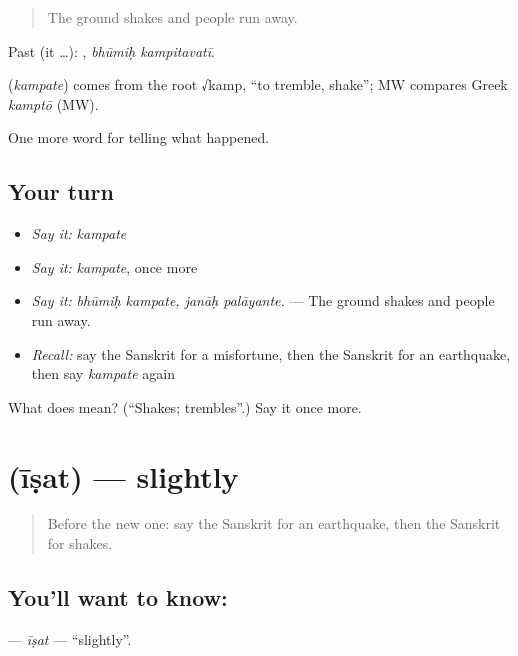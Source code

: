 \begin{quote}
The ground shakes and people run away.
\end{quote}

Past (it …):  , \emph{bhūmiḥ kampitavatī}.

\begin{cousinweb}
\textbf{} (\emph{kampate}) comes from the root √kamp, \textquotedblleft{}to tremble, shake\textquotedblright{}; MW compares Greek \emph{kamptō} (MW).
\end{cousinweb}

\begin{grammarlens}[title={What you've built}]
One more word for telling what happened.
\end{grammarlens}

\subsection*{Your turn}
\begin{itemize}
\raggedright
  \item \emph{Say it:} \emph{kampate}
  \item \emph{Say it:} \emph{kampate}, once more
  \item \emph{Say it:} \emph{bhūmiḥ kampate, janāḥ palāyante.} — The ground shakes and people run away.
  \item \emph{Recall:} say the Sanskrit for a misfortune, then the Sanskrit for an earthquake, then say \emph{kampate} again
\end{itemize}

\begin{tcolorbox}[breakable,colback=teal!4,colframe=teal!35!black,title={Before you move on}]
What does  mean? (\textquotedblleft{}Shakes; trembles\textquotedblright{}.) Say it once more.
\end{tcolorbox}
\section[\texorpdfstring{\sk{ईषत्} (īṣat)}{ईषत् (īṣat)}]{ (īṣat) — slightly}

\label{lesson:SA-C300-isat}



\begin{quote}
Before the new one: say the Sanskrit for an earthquake, then the Sanskrit for shakes.
\end{quote}

\subsection*{You'll want to know: }
\textbf{} — \emph{īṣat} — \textquotedblleft{}slightly\textquotedblright{}.

